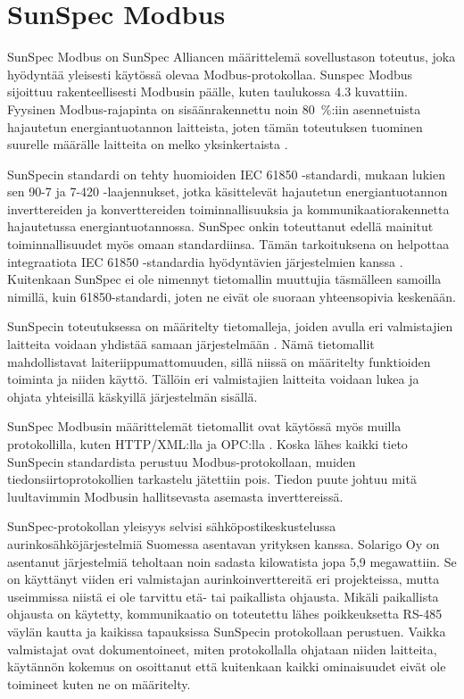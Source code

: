 \section{SunSpec Modbus}
  SunSpec Modbus on SunSpec Alliancen määrittelemä sovellustason toteutus, joka hyödyntää yleisesti käytössä olevaa Modbus-protokollaa. Sunspec Modbus sijoittuu rakenteellisesti Modbusin päälle, kuten taulukossa 4.3 kuvattiin. Fyysinen Modbus-rajapinta on sisäänrakennettu noin \SI{80}{\percent}:iin asennetuista hajautetun energiantuotannon laitteista, joten tämän toteutuksen tuominen suurelle määrälle laitteita on melko yksinkertaista \parencite{SSFactSheet}.

  SunSpecin standardi on tehty huomioiden \gls{IEC} 61850 -standardi, mukaan lukien sen 90-7 ja 7-420 -laajennukset, jotka käsittelevät hajautetun energiantuotannon inverttereiden ja konverttereiden toiminnallisuuksia ja kommunikaatiorakennetta hajautetussa energiantuotannossa. SunSpec onkin toteuttanut edellä mainitut toiminnallisuudet myös omaan standardiinsa. Tämän tarkoituksena on helpottaa integraatiota \gls{IEC} 61850 -standardia hyödyntävien järjestelmien kanssa \parencite{SSTech}. Kuitenkaan SunSpec ei ole nimennyt tietomallin muuttujia täsmälleen samoilla nimillä, kuin 61850-standardi, joten ne eivät ole suoraan yhteensopivia keskenään.

  SunSpecin toteutuksessa on määritelty tietomalleja, joiden avulla eri valmistajien laitteita voidaan yhdistää samaan järjestelmään \parencite{SSTech}. Nämä tietomallit mahdollistavat laiteriippumattomuuden, sillä niissä on määritelty funktioiden toiminta ja niiden käyttö. Tällöin eri valmistajien laitteita voidaan lukea ja ohjata yhteisillä käskyillä järjestelmän sisällä.

  SunSpec Modbusin määrittelemät tietomallit ovat käytössä myös muilla protokollilla, kuten \gls{HTTP}/\gls{XML}:lla ja \gls{OPC}:lla \parencite{SSTech}. Koska lähes kaikki tieto SunSpecin standardista perustuu Modbus-protokollaan, muiden tiedonsiirtoprotokollien tarkastelu jätettiin pois. Tiedon puute johtuu mitä luultavimmin Modbusin hallitsevasta asemasta inverttereissä.

  SunSpec-protokollan yleisyys selvisi sähköpostikeskustelussa aurinkosähköjärjestelmiä Suomessa asentavan yrityksen kanssa. Solarigo Oy on asentanut järjestelmiä teholtaan noin sadasta kilowatista jopa 5,9 megawattiin. Se on käyttänyt viiden eri valmistajan aurinkoinverttereitä eri projekteissa, mutta useimmissa niistä ei ole tarvittu etä- tai paikallista ohjausta. Mikäli paikallista ohjausta on käytetty, kommunikaatio on toteutettu lähes poikkeuksetta RS-485 väylän kautta ja kaikissa tapauksissa SunSpecin protokollaan perustuen. Vaikka valmistajat ovat dokumentoineet, miten protokollalla ohjataan niiden laitteita, käytännön kokemus on osoittanut että kuitenkaan kaikki ominaisuudet eivät ole toimineet kuten ne on määritelty. \parencite{Solarigo}


